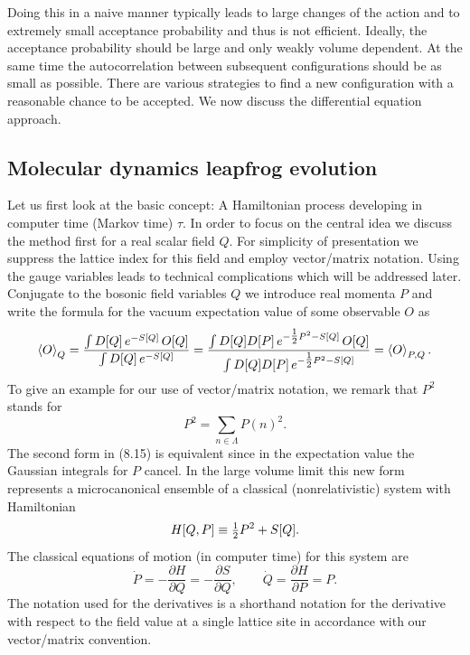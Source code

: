 Doing this in a naive manner typically leads to large changes of the action and
to extremely small acceptance probability and thus is not efficient. Ideally,
the acceptance probability should be large and only weakly volume dependent. At
the same time the autocorrelation between subsequent configurations should be
as small as possible.
There are various strategies to find a new configuration with a reasonable
chance to be accepted. We now discuss the differential equation approach.

\subsection{Molecular dynamics leapfrog evolution}

Let us first look at the basic concept: A Hamiltonian process developing in
computer time (Markov time) $\tau$. In order to focus on the central idea we
discuss the method first for a real scalar field $Q$. For simplicity of
presentation we suppress the lattice index for this field and employ
vector/matrix notation. Using the gauge variables leads to technical
complications which will be addressed later. Conjugate to the bosonic field
variables $Q$ we introduce real momenta $P$ and write the formula for the
vacuum expectation value of some observable $O$ as
\begin{equation}
\left\langle O \right\rangle_Q = \frac{\int D[Q]\,e^{-S[Q]}\,O[Q]}{\int D[Q]\,e^{-S[Q]}}
= \frac{\int D[Q]D[P]\,e^{-\tfrac{1}{2} P^2 - S[Q]}\,O[Q]}
        {\int D[Q]D[P]\,e^{-\tfrac{1}{2} P^2 - S[Q]}}
= \left\langle O \right\rangle_{P,Q}.
\end{equation}
To give an example for our use of vector/matrix notation, we remark that $P^2$
stands for
\begin{equation}
P^2 = \sum_{n\in\Lambda}P(n)^2.
\end{equation}
The second form in (8.15) is equivalent since in the expectation value the
Gaussian integrals for $P$ cancel. In the large volume limit this new form
represents a microcanonical ensemble of a classical (nonrelativistic) system
with Hamiltonian
\begin{equation}
H[Q,P] \equiv \tfrac{1}{2} P^2 + S[Q].
\end{equation}
The classical equations of motion (in computer time) for this system are
\begin{equation}
\dot{P} = -\frac{\partial H}{\partial Q} = -\frac{\partial S}{\partial Q},
\qquad \dot{Q} = \frac{\partial H}{\partial P} = P.
\end{equation}
The notation used for the derivatives is a shorthand notation for the
derivative with respect to the field value at a single lattice site in
accordance with our vector/matrix convention.

